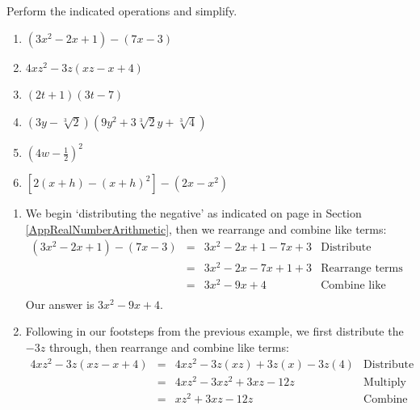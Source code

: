 \documentclass{ximera}
\begin{document}
\pagebreak

\begin{example}
\label{polyaddsubtmultex} 

Perform the indicated operations and simplify.

\begin{enumerate}

\item  $\left(3x^2 - 2x + 1\right) - (7x-3)$

\item  $4xz^2 - 3z(xz - x + 4)$

\item $(2t+1)(3t - 7)$ 

\item  $\left(3y - \sqrt[3]{2}\right)\left(9y^2 + 3\sqrt[3]{2} y + \sqrt[3]{4}\right)$

\item  $\left(4w -  \frac{1}{2} \right)^2$

\item  $\left[2(x+h) - (x+h)^2\right] - \left(2x - x^2 \right)$ 



\end{enumerate}


\begin{explanation}
\begin{enumerate}

\item  We begin `distributing the negative' as indicated on page \pageref{propertiesofnegatives} in Section \ref{AppRealNumberArithmetic}, then we rearrange and combine like terms:\[\begin{array}{rclr}

\left(3x^2 - 2x + 1\right) - (7x-3) &  = & 3x^2-2x+1 - 7x + 3 & \text{Distribute} \\
& = & 3x^2  -2x - 7x + 1 + 3 & \text{Rearrange terms} \\
& = & 3x^2 - 9x + 4 & \text{Combine like terms}  \\ 
\end {array} \] Our answer is $3x^2 - 9x + 4$.

\item  Following in our footsteps from the previous example, we first distribute the $-3z$ through, then rearrange and combine like terms:\[ \begin{array}{rclr}

4xz^2 - 3z(xz - x + 4) & = & 4xz^2 - 3z(xz) + 3z (x) - 3z(4) & \text{Distribute} \\
                       & = & 4xz^2 - 3xz^2 + 3xz - 12 z & \text{Multiply} \\
											 & = & xz^2+ 3xz - 12 z & \text{Combine like terms} \\


\end{array}\]
\end{enumerate}
\end{explanation}
\end{example}
\end{document}
